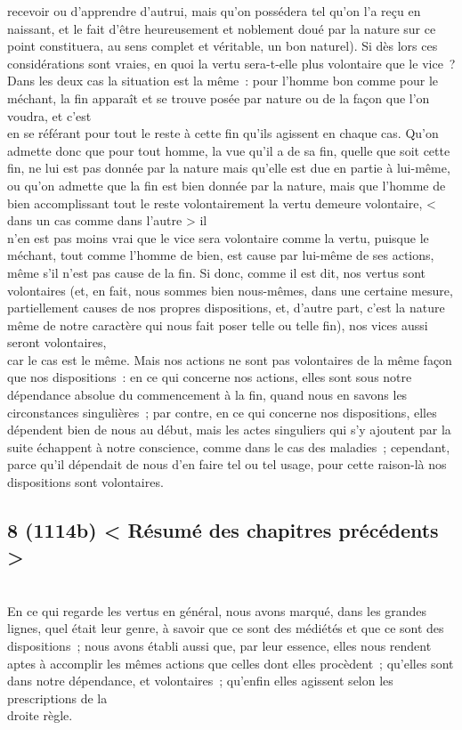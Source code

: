 \documentclass[french,twoside]{book} %
\begin{document}
recevoir ou d’apprendre d’autrui, mais qu’on possédera tel qu’on l’a reçu en naissant, et le fait d’être heureusement et noblement doué par la nature sur ce point constituera, au sens complet et véritable, un bon naturel). Si dès lors ces considérations sont vraies, en quoi la vertu sera-t-elle plus volontaire que le vice ? Dans les deux cas la situation est la même : pour l’homme bon comme pour le méchant, la fin apparaît et se trouve posée par nature ou de la façon que l’on voudra, et c’est \\
en se référant pour tout le reste à cette fin qu’ils agissent en chaque cas. Qu’on admette donc que pour tout homme, la vue qu’il a de sa fin, quelle que soit cette fin, ne lui est pas donnée par la nature mais qu’elle est due en partie à lui-même, ou qu’on admette que la fin est bien donnée par la nature, mais que l’homme de bien accomplissant tout le reste volontairement la vertu demeure volontaire, < dans un cas comme dans l’autre > il \\
n’en est pas moins vrai que le vice sera volontaire comme la vertu, puisque le méchant, tout comme l’homme de bien, est cause par lui-même de ses actions, même s’il n’est pas cause de la fin. Si donc, comme il est dit, nos vertus sont volontaires (et, en fait, nous sommes bien nous-mêmes, dans une certaine mesure, partiellement causes de nos propres dispositions, et, d’autre part, c’est la nature même de notre caractère qui nous fait poser telle ou telle fin), nos vices aussi seront volontaires, \\
 car le cas est le même. Mais nos actions ne sont pas volontaires de la même façon que nos dispositions : en ce qui concerne nos actions, elles sont sous notre dépendance absolue du commencement à la fin, quand nous en savons les circonstances singulières ; par contre, en ce qui concerne nos dispositions, elles dépendent bien de nous au début, mais les actes singuliers qui s’y ajoutent par la suite échappent à notre conscience, comme dans le cas des maladies ; cependant, parce qu’il dépendait de nous d’en faire tel ou tel usage, pour cette raison-là nos dispositions sont volontaires.
\subsection[{8 (1114b) < Résumé des chapitres précédents >}]{8 (1114b) < Résumé des chapitres précédents >}
\noindent \\
En ce qui regarde les vertus en général, nous avons marqué, dans les grandes lignes, quel était leur genre, à savoir que ce sont des médiétés et que ce sont des dispositions ; nous avons établi aussi que, par leur essence, elles nous rendent aptes à accomplir les mêmes actions que celles dont elles procèdent ; qu’elles sont dans notre dépendance, et volontaires ; qu’enfin elles agissent selon les prescriptions de la \\
droite règle.
\end{document}
